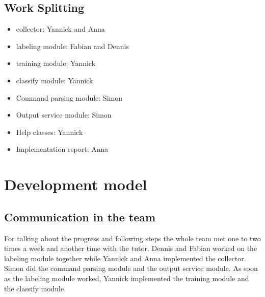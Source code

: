 \documentclass[parskip=full]{scrartcl}
\begin{document}
\subsection{Work Splitting}
\begin{itemize}

\item \Gls{collector}: Yannick and Anna

\item \Gls{labeling module}: Fabian and Dennis

\item \Gls{training module}: Yannick

\item \Gls{classify module}: Yannick

\item Command parsing module: Simon

\item Output service module: Simon

\item Help classes: Yannick

\item Implementation report: Anna

\end{itemize}


\section{Development model}
\subsection{Communication in the team}
For talking about the progress and following steps the whole team met one to two times a week and another time with the tutor.
Dennis and Fabian worked on the \gls{labeling module} together while Yannick and Anna implemented the \gls{collector}.
Simon did the command parsing module and the output service module.
As soon as the \gls{labeling module} worked, Yannick implemented the \gls{training module} and the \gls{classify module}.
\end{document}
